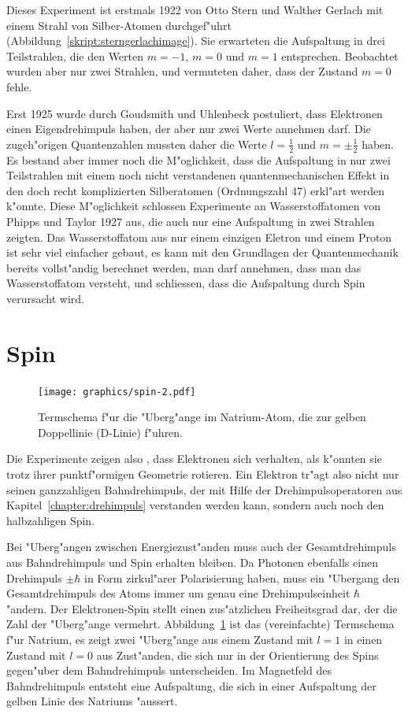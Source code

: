 Dieses Experiment ist erstmals 1922 von Otto Stern und Walther Gerlach
mit einem Strahl von Silber-Atomen durchgef"uhrt
%
(Abbildung~\ref{skript:sterngerlachimage}).
Sie erwarteten die Aufspaltung in drei Teilstrahlen, die den
Werten $m=-1$, $m=0$ und $m=1$ entsprechen.
Beobachtet wurden aber nur zwei Strahlen, und vermuteten daher, dass
der Zustand $m=0$ fehle.

Erst 1925 wurde durch Goudsmith und Uhlenbeck postuliert, dass Elektronen
einen Eigendrehimpuls haben, der aber nur zwei Werte annehmen darf.
Die zugeh"origen Quantenzahlen mussten daher die Werte $l=\frac12$ und
$m=\pm\frac12$ haben.
Es bestand aber immer noch die M"oglichkeit, dass die Aufspaltung
in nur zwei Teilstrahlen mit einem noch nicht verstandenen quantenmechanischen
Effekt in den doch recht komplizierten Silberatomen (Ordnungszahl 47)
erkl"art werden k"onnte.
Diese M"oglichkeit schlossen Experimente an Wasserstoffatomen
von Phipps und Taylor 1927 aus, die auch nur eine Aufspaltung
in zwei Strahlen zeigten.
Das Wasserstoffatom aus nur einem einzigen Eletron und einem Proton
ist sehr viel einfacher gebaut, es kann mit den Grundlagen
der Quantenmechanik bereits vollst"andig berechnet werden,
man darf annehmen, dass man das Wasserstoffatom versteht, und
schliessen, dass die Aufspaltung durch Spin verursacht wird.

%
%
\section{Spin}
\begin{figure}
\centering
\texttt{[image: graphics/spin-2.pdf]}
\caption{Termschema f"ur die "Uberg"ange im Natrium-Atom, die zur gelben
Doppellinie (D-Linie) f"uhren.
\label{skript:natriumdlinie}}
%
\end{figure}%
Die Experimente zeigen also , dass Elektronen sich verhalten, als k"onnten
sie trotz ihrer punktf"ormigen Geometrie rotieren.
Ein Elektron tr"agt also nicht nur seinen ganzzahligen Bahndrehimpuls,
der mit Hilfe der Drehimpulsoperatoren aus Kapitel~\ref{chapter:drehimpuls}
verstanden werden kann, sondern auch noch den halbzahligen Spin.

Bei "Uberg"angen zwischen Energiezust"anden muss auch der Gesamtdrehimpuls
aus Bahn\-dreh\-impuls und Spin erhalten bleiben.
Da Photonen ebenfalls einen Drehimpuls $\pm\hbar$ in Form zirkul"arer
Polarisierung 
haben, muss ein "Ubergang den Gesamtdrehimpuls des Atoms immer um genau
eine Drehimpulseinheit $\hbar$ "andern.
Der Elektronen-Spin stellt einen zus"atzlichen Freiheitsgrad dar, der die
Zahl der "Uberg"ange vermehrt.
Abbildung~\ref{skript:natriumdlinie} ist das (vereinfachte) Termschema f"ur 
Natrium, es zeigt zwei "Uberg"ange aus einem Zustand mit $l=1$ in einen
Zustand mit $l=0$ aus Zust"anden, die sich nur in der Orientierung
des Spins gegen"uber dem Bahndrehimpuls unterscheiden. 
Im Magnetfeld des Bahndrehimpuls entsteht eine Aufspaltung, die sich
in einer Aufspaltung der gelben Linie des Natriums "aussert.

